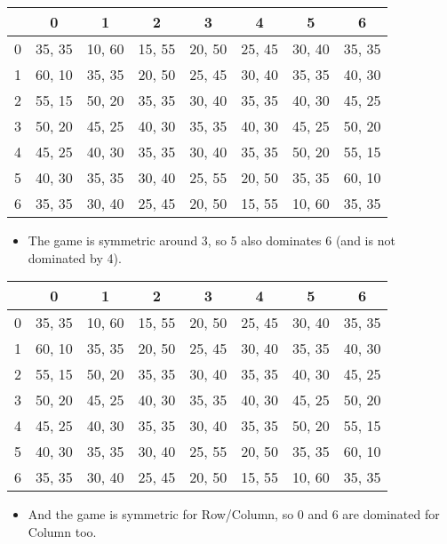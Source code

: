 \documentclass[
  ignorenonframetext,
]{beamer}
\providecommand{\tightlist}{%
  \setlength{\itemsep}{0pt}\setlength{\parskip}{0pt}}
\begin{document}
\begin{frame}
\begin{table}[!h]
\centering
\begin{tabular}[t]{>{}r|ccccccc}
\toprule
 & 0 & 1 & 2 & 3 & 4 & 5 & 6\\
\midrule
0 & 35, 35 & 10, 60 & 15, 55 & 20, 50 & 25, 45 & 30, 40 & 35, 35\\
1 & 60, 10 & 35, 35 & 20, 50 & 25, 45 & 30, 40 & 35, 35 & 40, 30\\
2 & 55, 15 & 50, 20 & 35, 35 & 30, 40 & 35, 35 & 40, 30 & 45, 25\\
3 & 50, 20 & 45, 25 & 40, 30 & 35, 35 & 40, 30 & 45, 25 & 50, 20\\
4 & 45, 25 & 40, 30 & 35, 35 & 30, 40 & 35, 35 & 50, 20 & 55, 15\\
5 & 40, 30 & 35, 35 & 30, 40 & 25, 55 & 20, 50 & 35, 35 & 60, 10\\
6 & 35, 35 & 30, 40 & 25, 45 & 20, 50 & 15, 55 & 10, 60 & 35, 35\\
\bottomrule
\end{tabular}
\end{table}

\begin{itemize}
\tightlist
\item
  The game is symmetric around 3, so 5 also dominates 6 (and is not
  dominated by 4).
\end{itemize}
\end{frame}

\begin{frame}
\begin{table}[!h]
\centering
\begin{tabular}[t]{>{}r|ccccccc}
\toprule
 & 0 & 1 & 2 & 3 & 4 & 5 & 6\\
\midrule
0 & 35, 35 & 10, 60 & 15, 55 & 20, 50 & 25, 45 & 30, 40 & 35, 35\\
1 & 60, 10 & 35, 35 & 20, 50 & 25, 45 & 30, 40 & 35, 35 & 40, 30\\
2 & 55, 15 & 50, 20 & 35, 35 & 30, 40 & 35, 35 & 40, 30 & 45, 25\\
3 & 50, 20 & 45, 25 & 40, 30 & 35, 35 & 40, 30 & 45, 25 & 50, 20\\
4 & 45, 25 & 40, 30 & 35, 35 & 30, 40 & 35, 35 & 50, 20 & 55, 15\\
5 & 40, 30 & 35, 35 & 30, 40 & 25, 55 & 20, 50 & 35, 35 & 60, 10\\
6 & 35, 35 & 30, 40 & 25, 45 & 20, 50 & 15, 55 & 10, 60 & 35, 35\\
\bottomrule
\end{tabular}
\end{table}

\begin{itemize}
\tightlist
\item
  And the game is symmetric for Row/Column, so 0 and 6 are dominated for
  Column too.
\end{itemize}
\end{frame}
\end{document}
